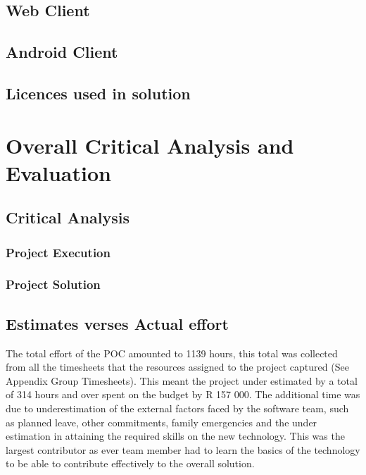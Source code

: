 \documentclass[12pt]{witseiepaper}
\begin{document}
\subsection{Web Client}

\subsection{Android Client}

\subsection{Licences used in solution}
 

\section{Overall Critical Analysis and Evaluation}

\subsection{Critical Analysis}

\subsubsection{Project Execution}


%  

\subsubsection{Project Solution}




\subsection{Estimates verses Actual effort}
The total effort of the POC amounted to 1139 hours, this total was collected from all the timesheets that the resources assigned to the project captured (See Appendix Group Timesheets). This meant the project under estimated by a total of 314 hours and over spent on the budget by R 157 000.  The additional time was due to underestimation of the external factors faced by the software team, such as planned leave, other commitments, family emergencies and the under estimation in attaining the required skills on the new technology. This was the largest contributor as ever team member had to learn the basics of the technology to be able to contribute effectively to the overall solution.
\end{document}
